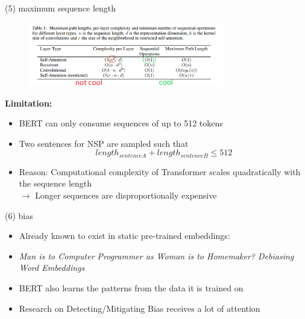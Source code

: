 \begin{frame}{(5) maximum sequence length}

\begin{figure}
\centering
\includegraphics[width = 8.5cm]{figure/bert-problem.png}\\ 
\end{figure}

\textbf{Limitation:}

\begin{itemize}
	\item BERT can only consume sequences of up to 512 tokens
	\item Two sentences for NSP are sampled such that $$length_{sentence A} + length_{sentence B} \leq 512$$
	\item Reason: Computational complexity of Transformer scales quadratically with the sequence length\\
				$\rightarrow$ Longer sequences are disproportionally expensive
\end{itemize}

\end{frame}


\begin{frame}{(6) bias}

\vfill

\begin{itemize}
	\item Already known to exist in static pre-trained embeddings:
	\item[] \textit{Man is to Computer Programmer as Woman is to Homemaker? Debiasing Word Embeddings} 
	\item BERT also learns the patterns from the data it is trained on
	\item Research on Detecting/Mitigating Bias receives a lot of attention
\end{itemize}


\vfill

\end{frame}

